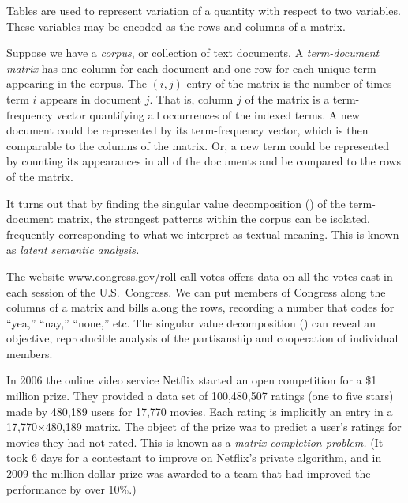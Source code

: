 Tables are used to represent variation of a quantity with respect to two variables. These variables may be encoded as the rows and columns of a matrix.

\begin{exam}
  Suppose we have a \textit{corpus}, or collection of text documents. A \textit{term-document matrix} has one column for each document and one row for each unique term appearing in the corpus. The $(i,j)$ entry of the matrix is the number of times term $i$ appears in document $j$. That is, column $j$ of the matrix is a term-frequency vector quantifying all occurrences of the indexed terms. A new document could be represented by its term-frequency vector, which is then comparable to the columns of the matrix. Or, a new term could be represented by counting its appearances in all of the documents and be compared to the rows of the matrix.

  It turns out that by finding the singular value decomposition () of the term-document matrix, the strongest patterns within the corpus can be isolated, frequently corresponding to what we interpret as textual meaning. This is known as \emph{latent semantic analysis.}
\end{exam}

\begin{exam}
  The website \url{www.congress.gov/roll-call-votes} offers data on all the votes cast in each session of the U.S.\ Congress. We can put members of Congress along the columns of a matrix and bills along the rows, recording a number that codes for ``yea,''  ``nay,'' ``none,'' etc. The singular value decomposition () can reveal an objective, reproducible analysis of the partisanship and cooperation of individual members.
\end{exam}

\begin{exam}
  In 2006 the online video service Netflix started an open competition for a \$1 million prize. They provided a data set of 100,480,507 ratings (one to five stars) made by 480,189 users for 17,770 movies. Each rating is implicitly an entry in a 17,770$\times$480,189 matrix. The object of the prize was to predict a user's ratings for movies they had not rated. This is known as a \emph{matrix completion problem.} (It took 6 days for a contestant to improve on Netflix's private algorithm, and in 2009 the million-dollar prize was awarded to a team that had improved the performance by over 10\%.)
\end{exam}

